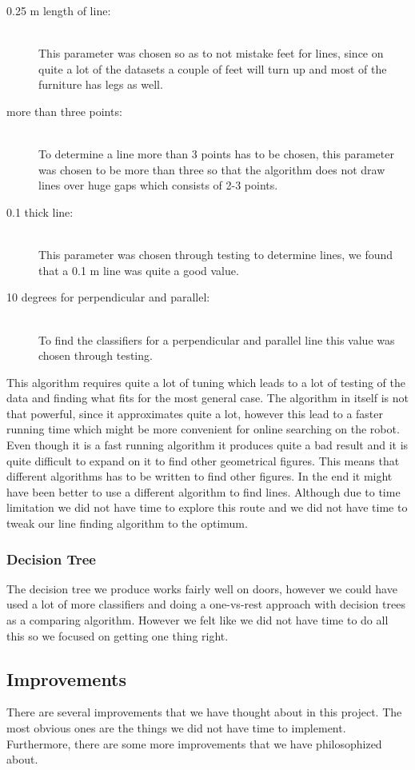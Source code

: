 \documentclass[a4paper, 10pt, conference]{ieeeconf}      %
\begin{document}
\begin{description}
\item[0.25 m length of line:] \hfill \\ This parameter was chosen so as to not mistake feet for lines, since on quite a lot of the datasets a couple of feet will turn up and most of the furniture has legs as well.
\item[more than three points:] \hfill \\ To determine a line more than 3 points has to be chosen, this parameter was chosen to be more than three so that the algorithm does not draw lines over huge gaps which consists of 2-3 points.
\item[0.1 thick line:] \hfill \\ This parameter was chosen through testing to determine lines, we found that a 0.1 m line was quite a good value.
\item[10 degrees for perpendicular and parallel:] \hfill \\ To find the classifiers for a perpendicular and parallel line this value was chosen through testing. 
\end{description}

This algorithm requires quite a lot of tuning which leads to a lot of testing of the data and finding what fits for the most general case. The algorithm in itself is not that powerful, since it approximates quite a lot, however this lead to a faster running time which might be more convenient for online searching on the robot.
Even though it is a fast running algorithm it produces quite a bad result and it is quite difficult to expand on it to find other geometrical figures. This means that different algorithms has to be written to find other figures. In the end it might have been better to use a different algorithm to find lines. Although due to time limitation we did not have time to explore this route and we did not have time to tweak our line finding algorithm to the optimum.


\subsubsection{Decision Tree}
The decision tree we produce works fairly well on doors, however we could have used a lot of more classifiers and doing a one-vs-rest approach with decision trees as a comparing algorithm. However we felt like we did not have time to do all this so we focused on getting one thing right.

\subsection{Improvements}
There are several improvements that we have thought about in this project. The most obvious ones are the things we did not have time to implement. Furthermore, there are some more improvements that we have philosophized about.
\end{document}
